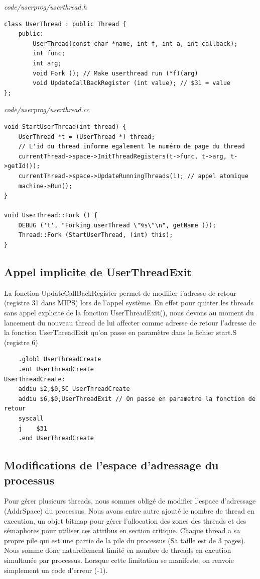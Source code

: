 \documentclass[a4paper,10pt]{article}
\begin{document}
\textit{code/userprog/userthread.h}
\begin{lstlisting}
class UserThread : public Thread {
    public:
        UserThread(const char *name, int f, int a, int callback);
        int func;
        int arg;
        void Fork (); // Make userthread run (*f)(arg)
        void UpdateCallBackRegister (int value); // $31 = value
};
\end{lstlisting}

\textit{code/userprog/userthread.cc}
\begin{lstlisting}
void StartUserThread(int thread) {
    UserThread *t = (UserThread *) thread;
    // L'id du thread informe egalement le numéro de page du thread
    currentThread->space->InitThreadRegisters(t->func, t->arg, t->getId());
    currentThread->space->UpdateRunningThreads(1); // appel atomique
    machine->Run();
}

void UserThread::Fork () {
    DEBUG ('t', "Forking userThread \"%s\"\n", getName ());
    Thread::Fork (StartUserThread, (int) this);
}
\end{lstlisting}

\subsection{Appel implicite de UserThreadExit}

La fonction UpdateCallBackRegister permet de modifier l'adresse de retour
(registre 31 dans MIPS) lors de l'appel système. En effet pour quitter les
threads sans appel explicite de la fonction UserThreadExit(), nous devons au
moment du lancement du nouveau thread de lui affecter comme adresse de retour
l'adresse de la fonction UserThreadExit qu'on passe en paramètre dans
le fichier start.S (registre 6)

\begin{lstlisting}
    .globl UserThreadCreate
    .ent UserThreadCreate
UserThreadCreate:
    addiu $2,$0,SC_UserThreadCreate
    addiu $6,$0,UserThreadExit // On passe en parametre la fonction de retour
    syscall
    j    $31
    .end UserThreadCreate
\end{lstlisting}


\subsection{Modifications de l'espace d'adressage du processus}

Pour gérer plusieurs threads, nous sommes obligé de modifier l'espace
d'adressage (AddrSpace) du processus. Nous avons entre autre ajouté le nombre
de thread en execution, un objet bitmap pour gérer l'allocation des
zones des threads et des sémaphores pour utiliser ces attribus en section
critique. Chaque thread a sa propre pile qui est une partie de la pile du
processus (Sa taille est de 3 pages). Nous somme donc naturellement limité en
nombre de threads en excution simultanée par processus. Lorsque cette limitation
se manifeste, on renvoie simplement un code d'erreur (-1).
\end{document}
